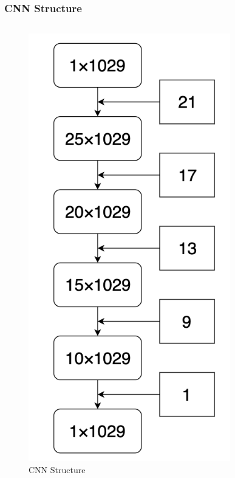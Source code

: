 \documentclass{beamer}
\begin{document}
\begin{frame}
\frametitle{CNN Structure}
\begin{columns}
\begin{figure}[H]
    \centering
    \caption{CNN Structure}
    \includegraphics[width=0.8\textwidth]{img/model.png}
\end{figure}

\end{columns}
\end{frame}
\end{document}
